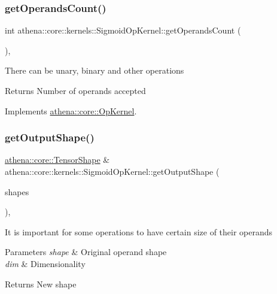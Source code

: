 \subsubsection{\texorpdfstring{get\+Operands\+Count()}{getOperandsCount()}}
{\footnotesize\ttfamily int athena\+::core\+::kernels\+::\+Sigmoid\+Op\+Kernel\+::get\+Operands\+Count (\begin{DoxyParamCaption}{ }\end{DoxyParamCaption})\hspace{0.3cm}{\ttfamily [override]}, {\ttfamily [virtual]}}

There can be unary, binary and other operations \begin{DoxyReturn}{Returns}
Number of operands accepted 
\end{DoxyReturn}


Implements \mbox{\hyperlink{classathena_1_1core_1_1_op_kernel_add97d4c132d80ecd9915acfedf7c9119}{athena\+::core\+::\+Op\+Kernel}}.

\mbox{\label{classathena_1_1core_1_1kernels_1_1_sigmoid_op_kernel_abd929f41de55a4898a0fce70025c1499}} 
\subsubsection{\texorpdfstring{get\+Output\+Shape()}{getOutputShape()}}
{\footnotesize\ttfamily \mbox{\hyperlink{classathena_1_1core_1_1_tensor_shape}{athena\+::core\+::\+Tensor\+Shape}} \& athena\+::core\+::kernels\+::\+Sigmoid\+Op\+Kernel\+::get\+Output\+Shape (\begin{DoxyParamCaption}\item[{std\+::vector$<$ \mbox{\hyperlink{classathena_1_1core_1_1_tensor_shape}{athena\+::core\+::\+Tensor\+Shape}} $>$ \&}]{shapes }\end{DoxyParamCaption})\hspace{0.3cm}{\ttfamily [override]}, {\ttfamily [virtual]}}

It is important for some operations to have certain size of their operands 
\begin{DoxyParams}{Parameters}
{\em shape} & Original operand shape \\
\hline
{\em dim} & Dimensionality \\
\hline
\end{DoxyParams}
\begin{DoxyReturn}{Returns}
New shape 
\end{DoxyReturn}


